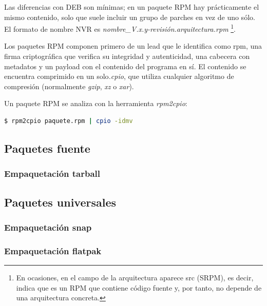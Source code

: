 \documentclass[a4paper, 11pt, titlepage]{article}
\begin{document}
            Las diferencias con DEB son mínimas; en un paquete RPM hay prácticamente el 
            mismo contenido, solo que suele incluir un grupo de parches en vez de uno sólo.
            El formato de nombre NVR es \textit{nombre\_V.x.y-revisión.arquitectura.rpm}
            \footnote{
                En ocasiones, en el campo de la arquitectura aparece src (SRPM), es decir, 
                indica que es un RPM que contiene código fuente y, por tanto, no depende 
                de una arquitectura concreta.
            }.

            Los paquetes RPM componen primero de un lead que le identifica como rpm, una 
            firma criptográfica que verifica su integridad y autenticidad, una cabecera con 
            metadatos y un payload con el contenido del programa en sí. El contenido se 
            encuentra comprimido en un solo\textit{.cpio}, que utiliza cualquier algoritmo 
            de compresión (normalmente \textit{gzip}, \textit{xz} o \textit{xar}). 
            
            Un paquete RPM se analiza con la herramienta \textit{rpm2cpio}:

            \begin{lstlisting}[language=bash]
    $ rpm2cpio paquete.rpm | cpio -idmv\end{lstlisting}
            
    \subsection{Paquetes fuente}

        \subsubsection{Empaquetación tarball}

    \subsection{Paquetes universales}

        \subsubsection{Empaquetación snap}

        \subsubsection{Empaquetación flatpak}
\end{document}
